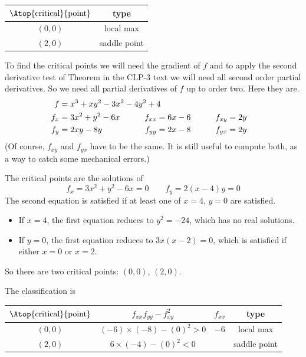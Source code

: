 %

\begin{answer}
\renewcommand{\arraystretch}{1.3}
     \begin{tabular}{|c|c|}
     \hline
    $\Atop{\text{critical}}{\text{point}}$  & type \\    
    \hline
     $(0,0)$  &  local max  \\ \hline
     $(2,0)$  &  saddle point \\  \hline
     \end{tabular}
\renewcommand{\arraystretch}{1.0}
\end{answer}

\begin{solution}
To find the critical points we will need the gradient of $f$ and to 
apply the second derivative test of 
Theorem  in the CLP-3 text 
we will need all second order partial derivatives. So we need all 
partial derivatives of $f$ up to order two.
Here they are.
\begin{alignat*}{3}
f&=x^3 + xy^2 - 3x^2 - 4y^2 + 4 \hidewidth\\
f_x&=3x^2+y^2-6x\qquad   & f_{xx}&=6x-6 \qquad & f_{xy}&= 2y\\
f_y&=2xy -8y & f_{yy}&=2x-8\qquad & f_{yx}&= 2y
\end{alignat*}
(Of course, $f_{xy}$ and $f_{yx}$ have to be the same. It is still
useful to compute both, as a way to catch some mechanical errors.)

The critical points are the solutions of
\begin{equation*}
f_x=3x^2+y^2-6x=0   \qquad
f_y=2(x-4)y = 0
\end{equation*}
The second equation is satisfied if at least one of $x=4$, $y=0$
are satisfied.
\begin{itemize}
\item
If $x=4$, the first equation reduces to $y^2=-24$, which has no real solutions.
\item 
If $y=0$, the first equation reduces to $3x(x-2)=0$, which is
satisfied if either $x=0$ or $x=2$.
\end{itemize}
So there are two critical points: $(0,0)$, $(2,0)$.


The classification is
\begin{center}
\renewcommand{\arraystretch}{1.3}
     \begin{tabular}{|c|c|c|c|}
     \hline
    $\Atop{\text{critical}}{\text{point}}$  & $f_{xx}f_{yy}-f_{xy}^2$ & 
                                                          $f_{xx}$ & type \\    
    \hline
     $(0,0)$  & $(-6)\times(-8)-(0)^2> 0$ &  $-6$  & local max  \\ \hline
     $(2,0)$  & $6\times(-4)-(0)^2<0$ &   & saddle point \\  \hline
     \end{tabular}
\renewcommand{\arraystretch}{1.0}
\end{center}
\end{solution}


